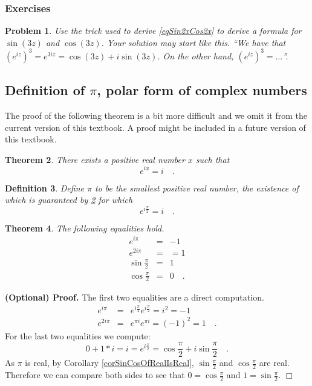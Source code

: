 \documentclass[12pt]{book}
\newenvironment{proofOptional}[1][]{ \noindent \textbf{(Optional) Proof#1.}}{$\Box$\medskip}
\newtheorem{theorem}{Theorem}[section]
\newtheorem{definition}[theorem]{Definition}
\newtheorem{problem}[theorem]{Problem}
\begin{document}
\subsubsection{Exercises}
\begin{problem}
Use the trick used to derive \eqref{eqSin2xCos2x} to derive a formula for $\sin(3z)$ and $\cos (3z)$. Your solution may start like this. ``We have that $(e^{iz})^3=e^{3iz}=\cos (3z)+i\sin(3z)$. On the other hand, $(e^{iz})^3= \dots$''.
\end{problem}
\subsection{Definition of $\pi$, polar form of complex numbers}\label{secPolarFormComplexNumbers}
\label{secDefinitionPi}

The proof of the following theorem is a bit more difficult and we omit it from the current version of this textbook. A proof might be included in a future version of this textbook.
\begin{theorem}\label{thPiExists}
There exists a positive real number $x$ such that \index{$\pi$}
\begin{equation}\boxed{
e^{ix}=i\quad .
}
\end{equation}
\end{theorem}

\begin{definition}
Define $\pi$ to be the smallest positive real number, the existence of which is guaranteed by \ref{thPiExists} for which
\begin{equation}\boxed{
e^{i\frac{\pi}{2} }= i\quad .
}
\end{equation}
\end{definition}



\begin{theorem} The following equalities hold.
\begin{equation}\label{eqe^ipi}
\begin{array}{rcl}
\displaystyle e^{i\pi}&=&-1\\
\displaystyle e^{2i\pi}&=&=1\\
\displaystyle \sin \frac{\pi}2 &=& 1\\
\displaystyle \cos \frac{\pi}2 &=& 0\quad .
\end{array}
\end{equation}
\end{theorem}
\begin{proofOptional}
The first two equalities are a direct computation.
\[
\begin{array}{rcl}
\displaystyle e^{i\pi}&=&\displaystyle  e^{i\frac{\pi}2}e^{i\frac{\pi}2}= i^2= -1\\
\displaystyle e^{2i\pi}&=&\displaystyle  e^{\pi i} e^{\pi i}= (-1)^2=1\quad .
\end{array}
\]
For the last two equalities we compute:
\[
0+ 1*i=i=e^{i\frac{\pi}2}= \cos \frac{\pi}2 + i\sin \frac\pi 2\quad .
\]
As $\pi$ is real, by Corollary \ref{corSinCosOfRealIsReal}, $\sin\frac{\pi}{2}$ and $\cos \frac{\pi}{2}$ are real. Therefore we can compare both sides to see that $0=\cos \frac{\pi}{2}$ and $1=\sin \frac \pi 2$.
\end{proofOptional}
\end{document}
